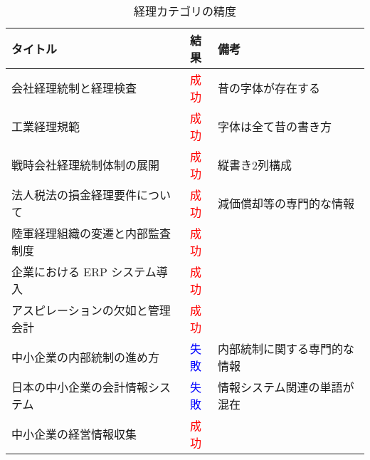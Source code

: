 \begin{table}[!htbp]
  \label{tab:doc_accounting}
  \setlength{\abovecaptionskip}{5pt}
  \setlength{\belowcaptionskip}{5pt}
  \caption{経理カテゴリの精度}
  \begin{center}
  \begin{tabular}{|l|c|l|}
    \hline
    \textbf{タイトル} & \textbf{結果} & \textbf{備考} \\ \hline
    会社経理統制と経理検査 & \textcolor{red}{成功} & 昔の字体が存在する \\ \hline
    工業経理規範 & \textcolor{red}{成功} & 字体は全て昔の書き方 \\ \hline
    戦時会社経理統制体制の展開 & \textcolor{red}{成功} & 縦書き2列構成 \\ \hline
    法人税法の損金経理要件について & \textcolor{red}{成功} & 減価償却等の専門的な情報 \\ \hline
    陸軍経理組織の変遷と内部監査制度 & \textcolor{red}{成功} & \\ \hline
    企業における ERP システム導入 & \textcolor{red}{成功} & \\ \hline
    アスピレーションの欠如と管理会計 & \textcolor{red}{成功} & \\ \hline
    中小企業の内部統制の進め方 & \textcolor{blue}{失敗} & 内部統制に関する専門的な情報 \\ \hline
    日本の中小企業の会計情報システム & \textcolor{blue}{失敗} & 情報システム関連の単語が混在 \\ \hline
    中小企業の経営情報収集 & \textcolor{red}{成功} & \\ \hline
  \end{tabular}
  \end{center}
\end{table}

